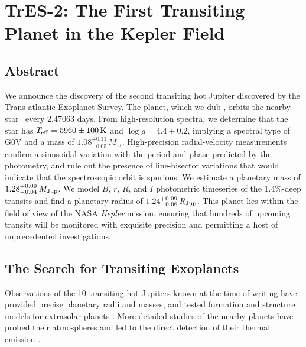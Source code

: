 \chapter[TrES-2: The First Transiting Planet in the Kepler Field]%
{%
TrES-2: The First Transiting Planet in the Kepler Field%
\protect\CFNC%
}
\label{cha:tres2}

\section*{Abstract}
\label{cha:tres2:sec:abs}

We announce the discovery of the second transiting hot Jupiter
discovered by the Trans-atlantic Exoplanet Survey. The planet, which
we dub \tresTwo, orbits the nearby star \gscOTF\ every 2.47063 days.  From
high-resolution spectra, we determine that the star has $T_{\rm
  eff}=5960\pm100\,\mathrm{K}$ and $\log{g}=4.4\pm0.2$, implying a
spectral type of G0V and a mass of $1.08^{+0.11}_{-0.05}\,M_{\sun}$.
High-precision radial-velocity measurements confirm a sinusoidal
variation with the period and phase predicted by the photometry, and
rule out the presence of line-bisector variations that
would indicate that the spectroscopic orbit is spurious.  We estimate
a planetary mass of $1.28^{+0.09}_{-0.04}\,M_{\rm Jup}$.  We model
$B$, $r$, $R$, and $I$ photometric timeseries of the 1.4\%-deep
transits and find a planetary radius of $1.24^{+0.09}_{-0.06}\,R_{\rm
  Jup}$.  This planet lies within the field of view of the NASA
\textit{Kepler} mission, ensuring that hundreds of upcoming transits
will be monitored with exquisite precision and permitting a host of
unprecedented investigations.

\section{The Search for Transiting Exoplanets}
\label{cha:tres2:sec:intro}

Observations of the 10 transiting hot Jupiters known at the time of writing have provided
precise planetary radii and masses, and tested formation and structure
models for extrasolar planets
\citep[see][]{Laughlin_Wolf_Vanmunster:apj:2005a,
  Charbonneau_Brown_Burrows:PPV:2007a}. More detailed studies of the
nearby planets have probed their atmospheres and led to the direct
detection of their thermal emission
\citep[e.g.,][]{Charbonneau_Brown_Noyes:apj:2002a,
  Charbonneau_Allen_Megeath:apj:2005a,
  Deming_Brown_Charbonneau:apj:2005a,
  Deming_Seager_Richardson:nat:2005a}.

